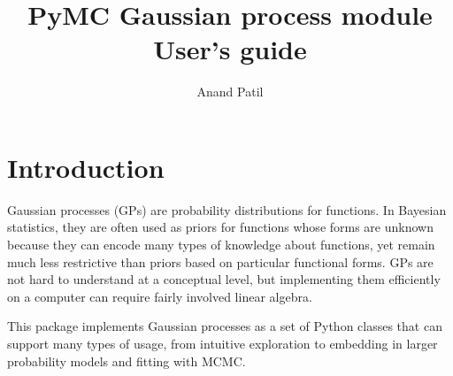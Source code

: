 \documentclass[]{manual}
\title{PyMC Gaussian process module \\User's guide}
\author{ Anand Patil }
\begin{document}
\maketitle

\tableofcontents

\chapter{Introduction}\label{cha:introduction} %

Gaussian processes (GPs) are probability distributions for functions. In Bayesian statistics, they are often used as priors for functions whose forms are unknown because they can encode many types of knowledge about functions, yet remain much less restrictive than priors based on particular functional forms. GPs are not hard to understand at a conceptual level, but implementing them efficiently on a computer can require fairly involved linear algebra.

This package implements Gaussian processes as a set of Python classes that can support many types of usage, from intuitive exploration to embedding in larger probability models and fitting with MCMC.
\end{document}

